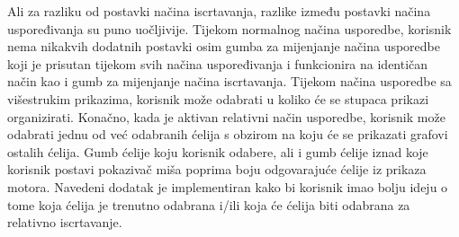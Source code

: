 \documentclass[times, utf8, diplomski]{fer}
\begin{document}
Ali za razliku od postavki načina iscrtavanja, razlike između postavki načina uspoređivanja su puno uočljivije. Tijekom normalnog načina usporedbe, korisnik nema nikakvih dodatnih postavki osim gumba za mijenjanje načina usporedbe koji je prisutan tijekom svih načina uspoređivanja i funkcionira na identičan način kao i gumb za mijenjanje načina iscrtavanja. Tijekom načina usporedbe sa višestrukim prikazima, korisnik može odabrati u koliko će se stupaca prikazi organizirati. Konačno, kada je aktivan relativni način usporedbe, korisnik može odabrati jednu od već odabranih ćelija s obzirom na koju će se prikazati grafovi ostalih ćelija. Gumb ćelije koju korisnik odabere, ali i gumb ćelije iznad koje korisnik postavi pokazivač miša poprima boju odgovarajuće ćelije iz prikaza motora. Navedeni dodatak je implementiran kako bi korisnik imao bolju ideju o tome koja ćelija je trenutno odabrana i/ili koja će ćelija biti odabrana za relativno iscrtavanje.
\end{document}

